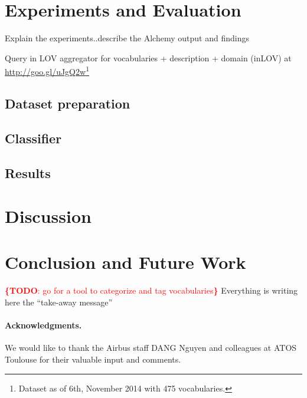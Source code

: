 \documentclass[runningheads,a4paper]{llncs}
\newcommand{\todo}[1]{\noindent\textcolor{red}{{\bf \{TODO}: #1{\bf \}}}}
\begin{document}

\section{Experiments and Evaluation}
\label{sec:classification}
Explain the experiments..describe the Alchemy output and findings

Query in LOV aggregator for vocabularies + description + domain (inLOV) at \url{http://goo.gl/uJgQ2w}\footnote{Dataset as of 6th, November 2014 with 475 vocabularies.}

\subsection{Dataset preparation}

\subsection{Classifier}

\subsection{Results}

\section{Discussion}
\label{sec:discussion}





\section{Conclusion and Future Work}
\label{sec:conclusion}
\todo{go for a tool to categorize and tag vocabularies}
Everything is writing here the ``take-away message''



\paragraph{\textbf{Acknowledgments.}} %
We would like to thank the Airbus staff DANG Nguyen and colleagues at ATOS Toulouse for their valuable input and comments.


\nocite{*}

\end{document}
